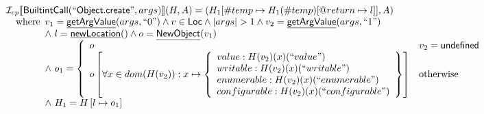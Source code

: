 \documentclass{article}
\newcommand{\SF}[1]{\mbox{\textsf{#1}}}
\newcommand{\wherec}[1]{{\rm where}\begin{array}[t]{l}#1\end{array}}
\newcommand{\owc}{{\rm otherwise}}
\newcommand{\Loc}{\SF{Loc}}
\newcommand{\I}{\mathcal{I}}
\newcommand{\lbr}{\llbracket}
\newcommand{\rbr}{\rrbracket}
\newcommand{\hf}[1]{\underline{\sf #1}}
\begin{document}
\[\begin{array}{l}
\I _{cp}\lbr \SF{BuiltintCall}(``\SF{Object.create}",args)\rbr(H,A)
 = (H_1[\#temp \mapsto H_1(\#temp)[@return \mapsto l]], A)\\
\quad\wherec{
  v_1 = \hf{getArgValue}(args, ``0") \land v \in\Loc
  \land |args| > 1 \land v_2 = \hf{getArgValue}(args, ``1")\\
  \land\ l=\hf{newLocation}() \land o=\hf{NewObject}(v_1)\\
  \land\ o_1 = \left\{\begin{array}{ll}
    o & v_2 = \SF{undefined}\\
    o\left[
    \forall x\in dom(H(v_2)): x \mapsto \left\{
      \begin{array}{l}
        value: H(v_2)(x)(``value")\\
        writable: H(v_2)(x)(``writable") \\
        enumerable: H(v_2)(x)(``enumerable")\\
        configurable: H(v_2)(x)(``configurable")\\
      \end{array}
      \right\}
    \right]  & \owc\\  
    \end{array}\right.\\
  \land\ H_1 = H\left[l\mapsto o_1\right]}\\
\end{array}
\]
\end{document}
